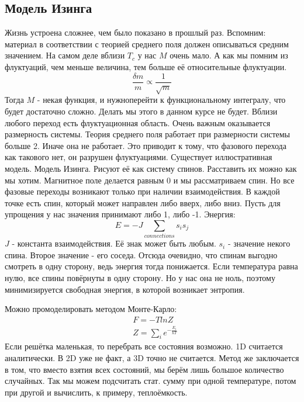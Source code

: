 \documentclass[a4paper, 12pt]{article}
\begin{document}
	\subsection{Модель Изинга}
	Жизнь устроена сложнее, чем было показано в прошлый раз. Вспомним: материал в соответствии с теорией среднего поля должен описываться средним значением. На самом деле вблизи $T_{c}$ у нас $M$ очень мало. А как мы помним из флуктуаций, чем меньше величина, тем больше её относительные флуктуации.
	\begin{equation*}
		\frac{\delta m}{m} \propto \frac{1}{\sqrt{m}}
	\end{equation*}
	Тогда $M$ - некая функция, и нужноперейти к функциональному интегралу, что будет достаточно сложно. Делать мы этого в данном курсе не будет. Вблизи любого переход есть флуктуационная область. Очень важным оказывается размерность системы. Теория среднего поля работает при размерности системы больше 2. Иначе она не работает. Это приводит к тому, что фазового перехода как такового нет, он разрушен флуктуациями. Существует иллюстративная модель. Модель Изинга. Рисуют её как систему спинов. Расставить их можно как мы хотим. Магнитное поле делается равным 0 и мы рассматриваем спин. Но все фазовые переходы возникают только при наличии взаимодействия. В каждой точке есть спин, который может направлен либо вверх, либо вниз. Пусть для упрощения у нас значения принимают либо 1, либо -1.  Энергия:
	\begin{equation*}
		E = - J \sum_{connections} s_{i} s_{j}
	\end{equation*}
	$J$ - константа взаимодействия. Её знак может быть любым. $s_{i}$ - значение некого спина. Второе значение - его соседа. Отсюда очевидно, что спинам выгодно смотреть в одну сторону, ведь  энергия тогда понижается. Если температура равна нулю, все спины повёрнуты в одну сторону. Но у нас она не ноль, поэтому минимизируется свободная энергия, в которой возникает энтропия.
	
	Можно промоделировать методом Монте-Карло:
	\begin{equation*}
		\begin{aligned}
			& F = - T lnZ                        \\
			& Z = \sum_{i} e^{-\frac{E_{i}}{kT}} 
		\end{aligned}
	\end{equation*}
	Если решётка маленькая, то перебрать все состояния возможно. 1D считается аналитически. В 2D уже не факт, а 3D точно не считается. Метод же заключается в том, что вместо взятия всех состояний, мы берём лишь большое количество случайных. Так мы можем подсчитать стат. сумму при одной температуре, потом при другой и вычислить, к примеру, теплоёмкость.
	
\end{document}
